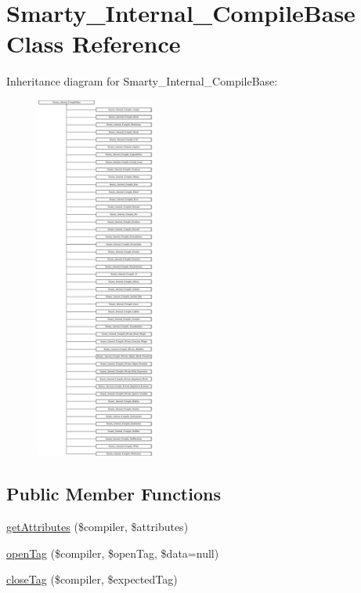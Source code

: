 \hypertarget{class_smarty___internal___compile_base}{}\section{Smarty\+\_\+\+Internal\+\_\+\+Compile\+Base Class Reference}
\label{class_smarty___internal___compile_base}
Inheritance diagram for Smarty\+\_\+\+Internal\+\_\+\+Compile\+Base\+:\begin{figure}[H]
\begin{center}
\leavevmode
\includegraphics[height=12.000000cm]{class_smarty___internal___compile_base}
\end{center}
\end{figure}
\subsection*{Public Member Functions}
\begin{DoxyCompactItemize}
\item 
\hyperlink{class_smarty___internal___compile_base_aaea144b9b60bfa0d6deead527008caeb}{get\+Attributes} (\$compiler, \$attributes)
\item 
\hyperlink{class_smarty___internal___compile_base_a9a3cc771a461da388c246778175e4c08}{open\+Tag} (\$compiler, \$open\+Tag, \$data=null)
\item 
\hyperlink{class_smarty___internal___compile_base_a9dd834d41afb9de693cb502ee3c55db6}{close\+Tag} (\$compiler, \$expected\+Tag)
\end{DoxyCompactItemize}
